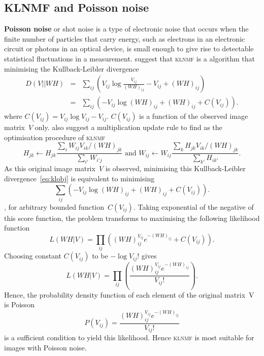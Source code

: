 \subsection{KLNMF and Poisson noise}
\textbf{Poisson noise} or shot noise is a type of electronic noise that
occurs when the finite number of particles that carry energy,
such as electrons in an electronic circuit or photons in an optical
device, is small enough to give rise to detectable statistical
fluctuations in a measurement.
\citet{lee2001algorithms} suggest that \textsc{klnmf} is a algorithm that minimising the Kullback-Leibler divergence
\begin{eqnarray}
  D(V||WH)&=&\sum_{ij}\left(V_{ij}\log\frac{V_{ij}}{\left(WH\right)_{ij}}-V_{ij}+\left(WH\right)_{ij}\right)\nonumber\\
          &=&\sum_{ij}\left(-V_{ij}\log\left(WH\right)_{ij}+\left(WH\right)_{ij}+C(V_{ij})\right).\label{eq:klobj}
\end{eqnarray}
where $C(V_{ij})=V_{ij}\log V_{ij}-V_{ij}$. $C(V_{ij})$ is a function of the observed image matrix~$V$ only.
\citet{lee2001algorithms} also suggest a multiplication update rule to find as the optimisation procedure of \textsc{klnmf}
\begin{equation}
H_{jk}\leftarrow H_{jk}\frac{\sum_{i}W_{ij}V_{ik}/(WH)_{jk}}{\sum_{i'}W_{i'j}} \text{ and } W_{ij}\leftarrow W_{ij}\frac{\sum_{k}H_{jk}V_{ik}/(WH)_{jk}}{\sum_{k'}H_{ik'}}. \label{eq:klnmf}
\end{equation}
As this original image matrix~$V$ is observed, minimising this Kullback-Leibler divergence~\eqref{eq:klobj} is equivalent to minimising
\begin{equation*}
  \sum_{ij}\left(-V_{ij}\log\left(WH\right)_{ij}+\left(WH\right)_{ij}+C(V_{ij})\right).
\end{equation*},
for arbitrary bounded function~$C(V_{ij})$. Taking exponential of the negative of this score function, the problem transforms to maximising the following likelihood function
\begin{equation*}
L(WH|V)=\prod_{ij}\left(\left(WH\right)_{ij}^{V_{ij}}e^{-\left(WH\right)_{ij}}+C(V_{ij})\right).
\end{equation*}
Choosing constant $C(V_{ij})$ to be $-\log V_{ij}!$ gives
\begin{equation*}
L(WH|V)=\prod_{ij}\left(\frac{\left(WH\right)_{ij}^{V_{ij}}e^{-\left(WH\right)_{ij}}}{V_{ij}!}\right).
\end{equation*}
Hence, the probability density function of each element of the original matrix~V is Poisson
\begin{equation*}
P(V_{ij})=\frac{\left(WH\right)_{ij}^{V_{ij}}e^{-\left(WH\right)_{ij}}}{V_{ij}!}
\end{equation*}
is a sufficient condition to yield this likelihood. Hence \textsc{klnmf} is most suitable for images with Poisson noise.

